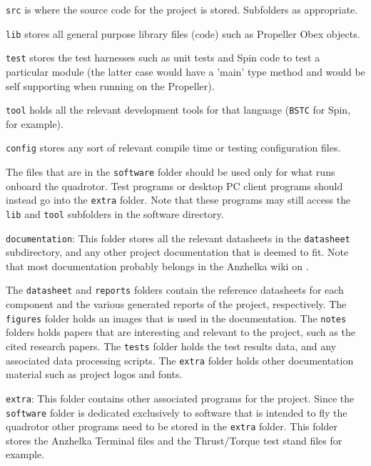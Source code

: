 \documentclass{article}
\numberwithin{equation}{section} %
\begin{document}
\begin{list}{*}{}
	\item \texttt{src} is where the source code for the project is stored. Subfolders as appropriate. 
	\item \texttt{lib} stores all general purpose library files (code) such as Propeller Obex objects. 
	\item \texttt{test} stores the test harnesses such as unit tests and Spin code to test a particular module (the latter case would have a 'main' type method and would be self supporting when running on the Propeller). 
	\item \texttt{tool} holds all the relevant development tools for that language (\texttt{BSTC} for Spin, for example). 
	\item \texttt{config} stores any sort of relevant compile time or testing configuration files. 
\end{list}
The files that are in the \texttt{software} folder should be used only for what runs onboard the quadrotor. Test programs or desktop PC client programs should instead go into the \texttt{extra} folder. Note that these programs may still access the \texttt{lib} and \texttt{tool} subfolders in the software directory. 

\texttt{documentation}:
This folder stores all the relevant datasheets in the \texttt{datasheet} subdirectory, and any other project documentation that is deemed to fit. Note that most documentation probably belongs in the Anzhelka wiki on \cite{anzhelka_code}. 

The \texttt{datasheet} and \texttt{reports} folders contain the reference datasheets for each component and the various generated reports of the project, respectively. The \texttt{figures} folder holds an images that is used in the documentation. The \texttt{notes} folders holds papers that are interesting and relevant to the project, such as the cited research papers. The \texttt{tests} folder holds the test results data, and any associated data processing scripts. The \texttt{extra} folder holds other documentation material such as project logos and fonts. 

\texttt{extra}:
This folder contains other associated programs for the project. Since the \texttt{software} folder is dedicated exclusively to software that is intended to fly the quadrotor other programs need to be stored in the \texttt{extra} folder. This folder stores the Anzhelka Terminal files and the Thrust/Torque test stand files for example.
\end{document}
